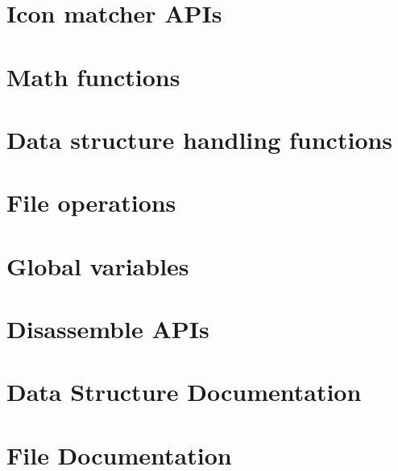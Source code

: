 \documentclass[a4paper]{article}
\begin{document}
\section{Icon matcher APIs}
\label{icon}
\hypertarget{icon}{}

\section{Math functions}
\label{math}
\hypertarget{math}{}

\section{Data structure handling functions}
\label{adt}
\hypertarget{adt}{}

\section{File operations}
\label{fileops}
\hypertarget{fileops}{}

\section{Global variables}
\label{globals}
\hypertarget{globals}{}

\section{Disassemble APIs}
\label{disasm}
\hypertarget{disasm}{}

\section{Data Structure Documentation}












\section{File Documentation}





\printindex
\end{document}

